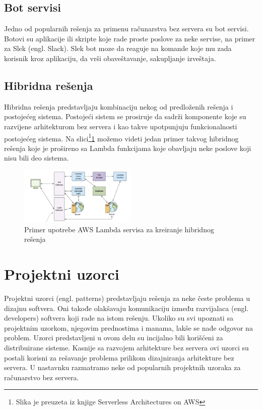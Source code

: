 \documentclass[12pt,oneside]{memoir}
\begin{document}
\subsection{Bot servisi}

Jedno od popularnih rešenja za primenu računarstva bez servera su bot servisi. Botovi su aplikacije ili skripte koje rade proste poslove za neke servise, na primer za Slek (engl. Slack). Slek bot moze da reaguje na komande koje mu zada korisnik kroz aplikaciju, da vrši obaveštavanje, sakupljanje izveštaja. 

\subsection{Hibridna rešenja}

Hibridna rešenja predstavljaju kombinaciju nekog od predloženih rešenja i postojećeg sistema. Postojeći sistem se prosiruje da sadrži komponente koje su razvijene arhitekturom bez servera i kao takve upotpunjuju funkcionalnosti postojećeg sistema. Na slici\footnote{Slika je preuzeta iz knjige Serverless Architectures on AWS}\ref{fig:HibridnoResenje} možemo videti jedan primer takvog hibridnog rešenja koje je prošireno sa Lambda funkcijama koje obavljaju neke poslove koji nisu bili deo sistema.

\begin{figure}[!ht]
  \centering
  \includegraphics[width=0.5\textwidth]{Slika 10.png}
  \caption{Primer upotrebe AWS Lambda servisa za kreiranje hibridnog rešenja}
  \label{fig:HibridnoResenje}
\end{figure}

\section{Projektni uzorci}

Projektni uzorci (engl. patterns) predstavljaju rešenja za neke česte problema u dizajnu softvera. Oni takođe olakšavaju komunikaciju između razvijalaca (engl. developers) softvera koji rade na istom rešenju. Ukoliko su svi upoznati sa projektnim uzorkom, njegovim prednostima i manama, lakše se nađe odgovor na problem. Uzorci predstavljeni u ovom delu su incijalno bili korišćeni za distribuirane sisteme. Kasnije sa razvojem arhitekture bez servera ovi uzorci su postali korisni za rešavanje problema prilikom dizajniranja arhitekture bez servera\cite{sa}. U nastavnku razmatramo neke od popularnih projektnih uzoraka za računarstvo bez servera.
\end{document}
